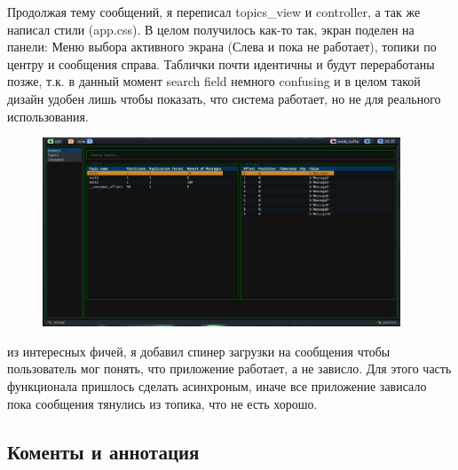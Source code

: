 \documentclass[10pt , a4paper]{report}
\begin{document}
Продолжая тему сообщений, я переписал topics\_view и controller, а так же написал стили (app.css). В целом получилось как-то так, экран поделен на панели: Меню выбора активного экрана (Слева и пока не работает), топики по центру и сообщения справа. Таблички почти идентичны и будут переработаны позже, т.к. в данный момент search field немного confusing и в целом такой дизайн удобен лишь чтобы показать, что система работает, но не для реального использования.

\begin{figure}[htpb]
  \begin{center}
    \includegraphics[width=0.95\textwidth]{imgs/FinalUI.png}
  \end{center}
  \caption{}\label{fig:}
\end{figure}

из интересных фичей, я добавил спинер загрузки на сообщения чтобы пользователь мог понять, что приложение работает, а не зависло. Для этого часть функционала пришлось сделать асинхроным, иначе все приложение зависало пока сообщения тянулись из топика, что не есть хорошо. 

\subsection{Коменты и аннотация}
\end{document}
